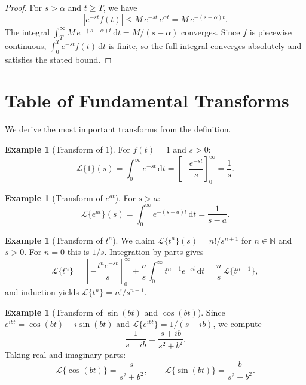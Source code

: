 \documentclass[12pt,a4paper,openany]{book}
\theoremstyle{definition}
\newtheorem{example}[definition]{Example}
\theoremstyle{plain}
\theoremstyle{remark}
\newcommand{\N}{\mathbb{N}}
\newcommand{\dd}{\mathrm{d}}
\newcommand{\abs}[1]{\left|#1\right|}
\begin{document}
\begin{proof}
For \(s>\alpha\) and \(t\ge T\), we have
\[
  \abs{e^{-st}f(t)} \le M\,e^{-st}\,e^{\alpha t} = M\,e^{-(s-\alpha)t}.
\]
The integral \(\int_T^\infty M\,e^{-(s-\alpha)t}\,\dd t = M/(s-\alpha)\)
converges. Since \(f\) is piecewise continuous, \(\int_0^T e^{-st}f(t)\,\dd t\)
is finite, so the full integral converges absolutely and satisfies the stated
bound.
\end{proof}

\section{Table of Fundamental Transforms}
\label{sec:laplace-table-derivations}

We derive the most important transforms from the definition.

\begin{example}[Transform of \(1\)]
\label{ex:laplace-1}
For \(f(t)=1\) and \(s>0\):
\[
  \mathcal{L}\{1\}(s) = \int_0^\infty e^{-st}\,\dd t
  = \left[-\frac{e^{-st}}{s}\right]_0^\infty = \frac{1}{s}.
\]
\end{example}

\begin{example}[Transform of \(e^{at}\)]
\label{ex:laplace-exp}
For \(s>a\):
\[
  \mathcal{L}\{e^{at}\}(s) = \int_0^\infty e^{-(s-a)t}\,\dd t
  = \frac{1}{s-a}.
\]
\end{example}

\begin{example}[Transform of \(t^n\)]
\label{ex:laplace-tn}
We claim \(\mathcal{L}\{t^n\}(s)=n!/s^{n+1}\) for \(n\in\N\) and \(s>0\).
For \(n=0\) this is \(1/s\). Integration by parts gives
\[
  \mathcal{L}\{t^n\} = \left[-\frac{t^n e^{-st}}{s}\right]_0^\infty
  + \frac{n}{s}\int_0^\infty t^{n-1}e^{-st}\,\dd t
  = \frac{n}{s}\,\mathcal{L}\{t^{n-1}\},
\]
and induction yields \(\mathcal{L}\{t^n\}=n!/s^{n+1}\).
\end{example}

\begin{example}[Transform of \(\sin(bt)\) and \(\cos(bt)\)]
\label{ex:laplace-sincos}
Since \(e^{ibt}=\cos(bt)+i\sin(bt)\) and
\(\mathcal{L}\{e^{ibt}\}=1/(s-ib)\), we compute
\[
  \frac{1}{s-ib} = \frac{s+ib}{s^2+b^2}.
\]
Taking real and imaginary parts:
\[
  \mathcal{L}\{\cos(bt)\} = \frac{s}{s^2+b^2}, \qquad
  \mathcal{L}\{\sin(bt)\} = \frac{b}{s^2+b^2}.
\]
\end{example}
\end{document}

